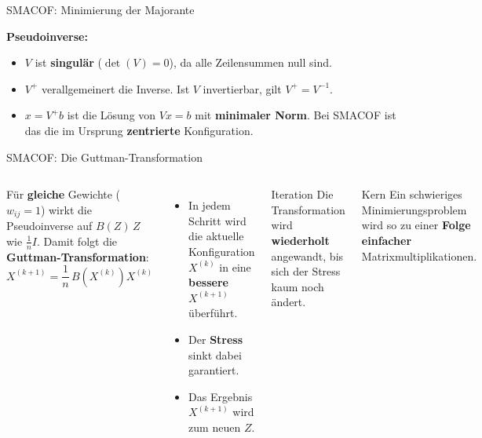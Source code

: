 \begin{frame}{SMACOF: Minimierung der Majorante}
{\textbf{Pseudoinverse:}
\begin{itemize}
    \item $V$ ist \textbf{singulär} ($\det(V) = 0$), da alle Zeilensummen null sind.
    \item $V^{+}$ verallgemeinert die Inverse. Ist $V$ invertierbar, gilt $V^{+} = V^{-1}$.
    \item $x = V^{+}b$ ist die Lösung von $Vx = b$ mit \textbf{minimaler Norm}. Bei SMACOF ist das die im Ursprung \textbf{zentrierte} Konfiguration.
\end{itemize}
}
\end{frame}

\begin{frame}{SMACOF: Die Guttman-Transformation}
\footnotesize
\begin{columns}
Für \textbf{gleiche} Gewichte ($w_{ij} = 1$) wirkt die Pseudoinverse
auf $B(Z)\,Z$ wie $\tfrac{1}{n}I$. Damit folgt die
\textbf{Guttman-Transformation}:
\[
  X^{(k+1)} = \frac{1}{n}\,B\!\left(X^{(k)}\right) X^{(k)}
\]

\begin{itemize}
  \item In jedem Schritt wird die aktuelle Konfiguration $X^{(k)}$ in eine
        \textbf{bessere} $X^{(k+1)}$ überführt.
  \item Der \textbf{Stress} sinkt dabei garantiert.
  \item Das Ergebnis $X^{(k+1)}$ wird zum neuen $Z$.
\end{itemize}

\begin{blockC1}{\footnotesize Iteration}
Die Transformation wird \textbf{wiederholt} angewandt, bis sich der Stress
kaum noch ändert.
\end{blockC1}

\begin{blockC2}{\footnotesize Kern}
Ein schwieriges Minimierungsproblem wird so zu einer \textbf{Folge einfacher}
Matrixmultiplikationen.
\end{blockC2}
\end{columns}
\end{frame}


